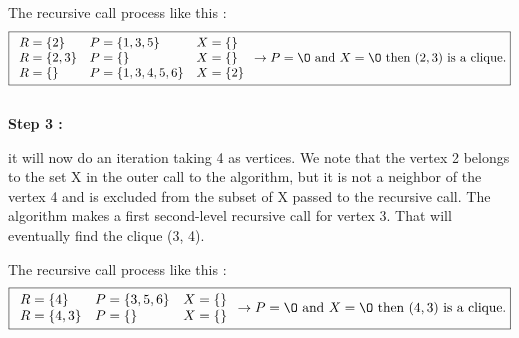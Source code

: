 The recursive call process like this  :
$$ \boxed{
        \begin{array}{lll}
            R = \{2\}   & P = \{1,3,5\}     & X = \{\}  \\
            R = \{2,3\} & P = \{\}          & X = \{\}  \\
            R = \{\}    & P = \{1,3,4,5,6\} & X = \{2\} \\
        \end{array}
        \rightarrow P = \O \text{ and } X = \O \text{ then } (2,3) \text{ is a clique.}
    }$$
\\
\hspace*{1cm}  \textbf{Step 3 :}
\\
\begin{minipage}{0.4\textwidth}
\end{minipage}
\begin{minipage}{0.6\textwidth}
    it will now do an iteration taking 4 as vertices. We note that the vertex 2 belongs to the set X in the outer call to the algorithm, but it is not a neighbor of the vertex 4 and is excluded from the subset of X passed to the recursive call. The algorithm makes a first second-level recursive call for vertex 3. That will eventually find the clique (3, 4).
\end{minipage}
The recursive call process like this  :
$$ \boxed{
        \begin{array}{lll}
            R = \{4\}   & P = \{3,5,6\} & X = \{\} \\
            R = \{4,3\} & P = \{\}      & X = \{\} \\
        \end{array}
        \rightarrow P = \O \text{ and } X = \O \text{ then } (4,3) \text{ is a clique.}
    }$$
\\
\begin{minipage}{0.4\textwidth}
\end{minipage}
